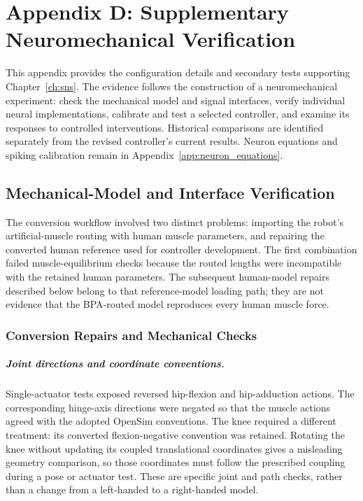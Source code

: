 \chapter{Appendix D: Supplementary Neuromechanical Verification}\label{app:simulation_verification}
\graphicspath{{../Figures/95-AppendixD/}{figs/95-AppendixD/}}

This appendix provides the configuration details and secondary tests supporting Chapter~\ref{ch:sns}. The evidence follows the construction of a neuromechanical experiment: check the mechanical model and signal interfaces, verify individual neural implementations, calibrate and test a selected controller, and examine its responses to controlled interventions. Historical comparisons are identified separately from the revised controller's current results. Neuron equations and spiking calibration remain in Appendix~\ref{app:neuron_equations}.



\section{Mechanical-Model and Interface Verification}\label{sec:app_conversion_repairs}

The conversion workflow involved two distinct problems: importing the robot's artificial-muscle routing with human muscle parameters, and repairing the converted human reference used for controller development. The first combination failed muscle-equilibrium checks because the routed lengths were incompatible with the retained human parameters. The subsequent human-model repairs described below belong to that reference-model loading path; they are not evidence that the BPA-routed model reproduces every human muscle force.

\subsection{Conversion Repairs and Mechanical Checks}

\paragraph{Joint directions and coordinate conventions.}
Single-actuator tests exposed reversed hip-flexion and hip-adduction actions. The corresponding hinge-axis directions were negated so that the muscle actions agreed with the adopted OpenSim conventions. The knee required a different treatment: its converted flexion-negative convention was retained. Rotating the knee without updating its coupled translational coordinates gives a misleading geometry comparison, so those coordinates must follow the prescribed coupling during a pose or actuator test. These are specific joint and path checks, rather than a change from a left-handed to a right-handed model.

